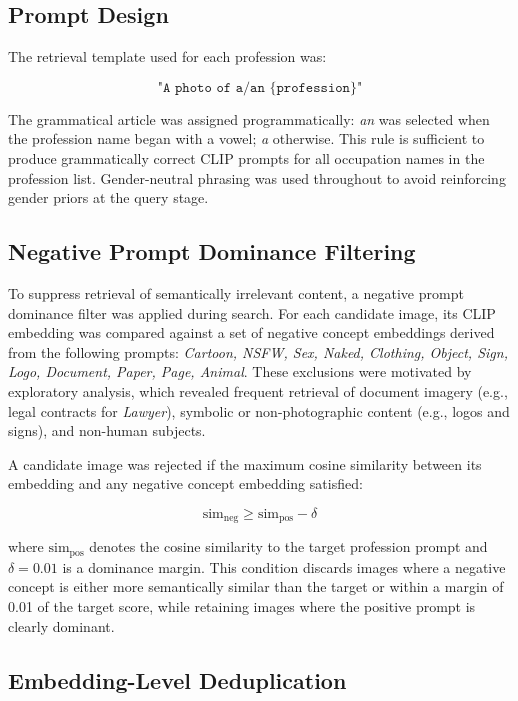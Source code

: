 \subsection{Prompt Design}

The retrieval template used for each profession was:

\[
\texttt{"A photo of a/an \{profession\}"}
\]

The grammatical article was assigned programmatically: \textit{an} was selected when the profession name began with a vowel; \textit{a} otherwise. This rule is sufficient to produce grammatically correct CLIP prompts for all occupation names in the profession list. Gender-neutral phrasing was used throughout to avoid reinforcing gender priors at the query stage.

\subsection{Negative Prompt Dominance Filtering}

To suppress retrieval of semantically irrelevant content, a negative prompt dominance filter was applied during search. For each candidate image, its CLIP embedding was compared against a set of negative concept embeddings derived from the following prompts: \emph{Cartoon, NSFW, Sex, Naked, Clothing, Object, Sign, Logo, Document, Paper, Page, Animal}. These exclusions were motivated by exploratory analysis, which revealed frequent retrieval of document imagery (e.g., legal contracts for \emph{Lawyer}), symbolic or non-photographic content (e.g., logos and signs), and non-human subjects.

A candidate image was rejected if the maximum cosine similarity between its embedding and any negative concept embedding satisfied:

\[
\text{sim}_{\text{neg}} \geq \text{sim}_{\text{pos}} - \delta
\]

where $\text{sim}_{\text{pos}}$ denotes the cosine similarity to the target profession prompt and $\delta = 0.01$ is a dominance margin. This condition discards images where a negative concept is either more semantically similar than the target or within a margin of 0.01 of the target score, while retaining images where the positive prompt is clearly dominant.

\subsection{Embedding-Level Deduplication}

